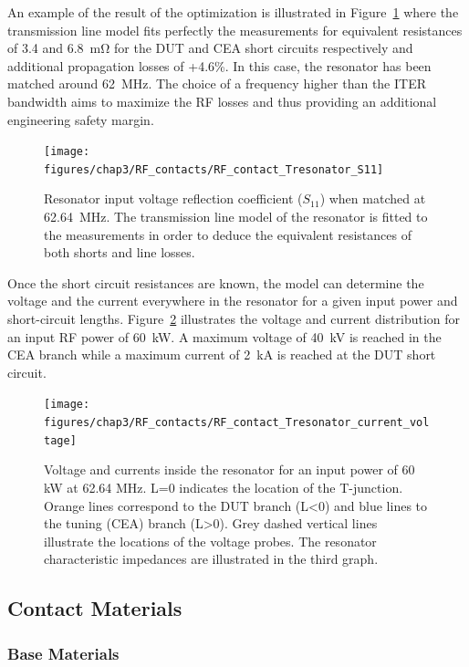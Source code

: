 {An example of the result of the optimization is illustrated in Figure~\ref{fig:rfcontacttresonators11} where the transmission line model fits perfectly the measurements for equivalent resistances of 3.4 and 6.8~mΩ for the DUT and CEA short circuits respectively and additional propagation losses of +4.6\%. In this case, the resonator has been matched around 62~MHz. The choice of a frequency higher than the ITER bandwidth aims to maximize the RF losses and thus providing an additional engineering safety margin. 

\begin{figure}[h]
	\centering
	\texttt{[image: figures/chap3/RF\_contacts/RF\_contact\_Tresonator\_S11]}
	\caption{Resonator input voltage reflection coefficient ($S_{11}$) when matched at 62.64~MHz. The transmission line model of the resonator is fitted to the measurements in order to deduce the equivalent resistances of both shorts and line losses. }
	\label{fig:rfcontacttresonators11}
\end{figure}


Once the short circuit resistances are known, the model can determine the voltage and the current everywhere in the resonator for a given input power and short-circuit lengths. Figure~\ref{fig:rfcontacttresonatorcurrentvoltage} illustrates the voltage and current distribution for an input RF power of 60~kW. A maximum voltage of 40~kV is reached in the CEA branch while a maximum current of 2~kA is reached at the DUT short circuit. 

\begin{figure}[h]
	\centering
	\texttt{[image: figures/chap3/RF\_contacts/RF\_contact\_Tresonator\_current\_voltage]}
	\caption{Voltage and currents inside the resonator for an input power of 60 kW at 62.64 MHz. L=0 indicates the location of the T-junction. Orange lines correspond to the DUT branch (L<0) and blue lines to the tuning (CEA) branch (L>0). Grey dashed vertical lines illustrate the locations of the voltage probes. The resonator characteristic impedances are illustrated in the third graph.}
	\label{fig:rfcontacttresonatorcurrentvoltage}
\end{figure}


\clearpage

\subsection{Contact Materials}
\subsubsection{Base Materials}

}
